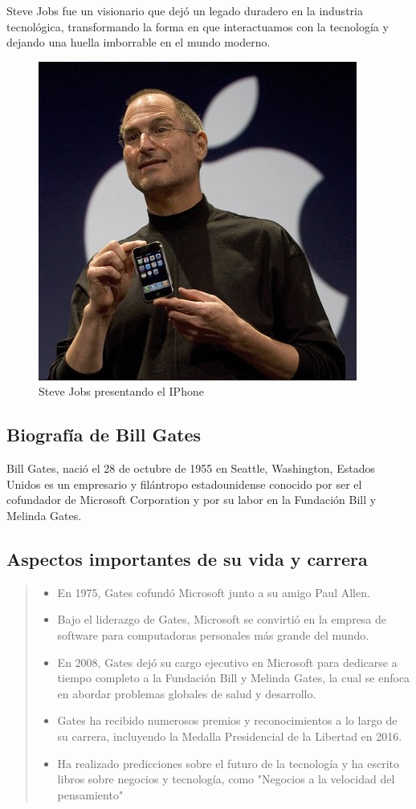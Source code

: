 \documentclass[11pt,twoside]{book}
\begin{document}
Steve Jobs fue un visionario que dejó un legado duradero en la industria tecnológica, transformando la forma en que interactuamos con la tecnología y dejando una huella imborrable en el mundo moderno.
\begin{figure}[htb]
  \centering
  \includegraphics[width=0.8\linewidth]{bibliografias/jobs.PNG}
  \caption{Steve Jobs presentando el IPhone}
  \label{fig:etiqueta}
\end{figure}

\newpage

\subsection{Biografía de Bill Gates}
Bill Gates, nació el 28 de octubre de 1955 en Seattle, Washington, Estados Unidos es un empresario y filántropo estadounidense conocido por ser el cofundador de Microsoft Corporation y por su labor en la Fundación Bill y Melinda Gates. 
\subsection*{Aspectos importantes de su vida y carrera}
\begin{quote}
\begin{itemize}
\item En 1975, Gates cofundó Microsoft junto a su amigo Paul Allen.
\item Bajo el liderazgo de Gates, Microsoft se convirtió en la empresa de software para computadoras personales más grande del mundo.
\item En 2008, Gates dejó su cargo ejecutivo en Microsoft para dedicarse a tiempo completo a la Fundación Bill y Melinda Gates, la cual se enfoca en abordar problemas globales de salud y desarrollo.
\item Gates ha recibido numerosos premios y reconocimientos a lo largo de su carrera, incluyendo la Medalla Presidencial de la Libertad en 2016.
\item Ha realizado predicciones sobre el futuro de la tecnología y ha escrito libros sobre negocios y tecnología, como "Negocios a la velocidad del pensamiento"
\end{itemize}
\end{quote}
\end{document}
